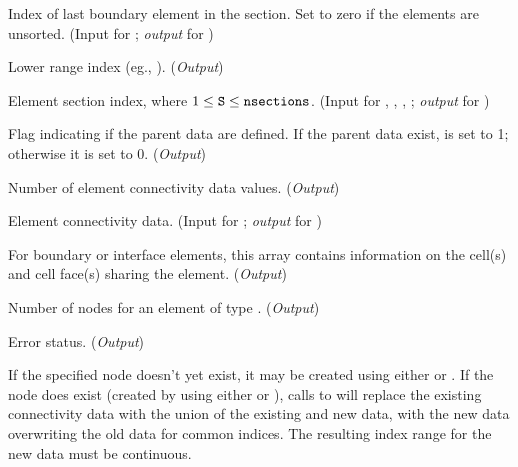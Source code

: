 \begin{Ventryi}{}
      Index of last boundary element in the section.
      Set to zero if the elements are unsorted.
      (\textcolor{input}{Input} for ;
      \textcolor{output}{\textit{output}} for )
\item [\fort{nsections}]
      Lower range index (eg., ).
      (\textcolor{output}{\textit{Output}})
\item [\fort{S}]
      Element section index, where $1 \leq \text{{\normalfont\texttt{S}}} \leq \text{{\normalfont\texttt{nsections}}}$.
      (\textcolor{input}{Input} for ,
      , ,
      ;
      \textcolor{output}{\textit{output}} for )
\item [\fort{parent\_flag}]
      Flag indicating if the parent data are defined.
      If the parent data exist,  is set to 1;
      otherwise it is set to 0.
      (\textcolor{output}{\textit{Output}})
\item [\fort{ElementDataSize}]
      Number of element connectivity data values.
      (\textcolor{output}{\textit{Output}})
\item [\fort{Elements}]
      Element connectivity data.
      (\textcolor{input}{Input} for ;
      \textcolor{output}{\textit{output}} for )
\item [\fort{ParentData}]
      For boundary or interface elements, this array contains
      information on the cell(s) and cell face(s) sharing the element.
      (\textcolor{output}{\textit{Output}})
\item [\fort{npe}]
      Number of nodes for an element of type .
      (\textcolor{output}{\textit{Output}})
\item [\fort{ier}]
      Error status.
      (\textcolor{output}{\textit{Output}})
\end{Ventryi}

If the specified  node doesn't yet exist,
it may be created using either  or
.
If the  node does exist (created by using either
 or ),
calls to  will replace the existing
connectivity data with the union of the existing and new data, with the
new data overwriting the old data for common indices.
The resulting index range for the new data must be continuous.

